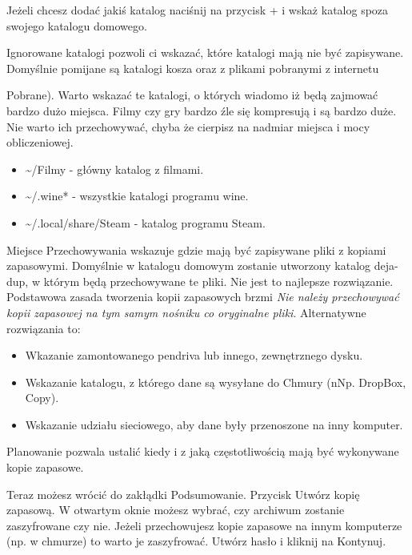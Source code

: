 Jeżeli chcesz dodać jakiś katalog naciśnij na przycisk \textcolor{ubuntu_orange}{+} i wskaż katalog spoza swojego katalogu domowego.

\textcolor{ubuntu_orange}{Ignorowane katalogi} pozwoli ci wskazać, które katalogi mają nie być zapisywane. Domyślnie pomijane są katalogi kosza oraz z plikami pobranymi z internetu {Pobrane). Warto wskazać te katalogi, o których wiadomo iż będą zajmować bardzo dużo miejsca. Filmy czy gry bardzo źle się kompresują i są bardzo duże. Nie warto ich przechowywać, chyba że cierpisz na nadmiar miejsca i mocy obliczeniowej.
\begin{itemize}
\item \textcolor{ubuntu_orange}{\textasciitilde /Filmy} - główny katalog z filmami.
\item \textcolor{ubuntu_orange}{\textasciitilde /.wine*} - wszystkie katalogi programu wine.
\item \textcolor{ubuntu_orange}{\textasciitilde /.local/share/Steam} - katalog programu Steam.
\end{itemize}

\textcolor{ubuntu_orange}{Miejsce Przechowywania} wskazuje gdzie mają być zapisywane pliki z kopiami zapasowymi.  Domyślnie w katalogu domowym zostanie utworzony katalog \textcolor{ubuntu_orange}{deja-dup}, w którym będą przechowywane te pliki. Nie jest to najlepsze rozwiązanie. Podstawowa zasada tworzenia kopii zapasowych brzmi \emph{Nie należy przechowywać kopii zapasowej na tym samym nośniku co oryginalne pliki}. Alternatywne rozwiązania to:
\begin{itemize}
\item Wkazanie zamontowanego pendriva lub innego, zewnętrznego dysku.
\item Wskazanie katalogu, z którego dane są wysyłane do Chmury (nNp. DropBox, Copy).
\item Wskazanie udziału sieciowego, aby dane były przenoszone na inny komputer.
\end{itemize}

\textcolor{ubuntu_orange}{Planowanie} pozwala ustalić kiedy i z jaką częstotliwością mają być wykonywane kopie zapasowe.

Teraz możesz wrócić do zakłądki \textcolor{ubuntu_orange}{Podsumowanie}. Przycisk \textcolor{ubuntu_orange}{Utwórz kopię zapasową}. W otwartym oknie możesz wybrać, czy archiwum zostanie zaszyfrowane czy nie. Jeżeli przechowujesz kopie zapasowe na innym komputerze (np. w chmurze) to warto je zaszyfrować. Utwórz hasło i kliknij na \textcolor{ubuntu_orange}{Kontynuj}.

}
